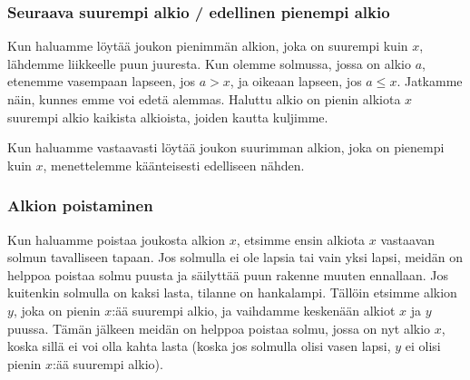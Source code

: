 \subsubsection{Seuraava suurempi alkio / edellinen pienempi alkio}

Kun haluamme löytää joukon pienimmän alkion,
joka on suurempi kuin $x$,
lähdemme liikkeelle puun juuresta.
Kun olemme solmussa, jossa on alkio $a$,
etenemme vasempaan lapseen,
jos $a>x$, ja oikeaan lapseen, jos $a \le x$.
Jatkamme näin, kunnes emme voi edetä alemmas.
Haluttu alkio on pienin alkiota $x$ suurempi alkio
kaikista alkioista, joiden kautta kuljimme.

Kun haluamme vastaavasti löytää joukon suurimman alkion,
joka on pienempi kuin $x$,
menettelemme käänteisesti edelliseen nähden.

\subsubsection{Alkion poistaminen}

Kun haluamme poistaa joukosta alkion $x$, etsimme ensin
alkiota $x$ vastaavan solmun tavalliseen tapaan.
Jos solmulla ei ole lapsia tai vain yksi lapsi,
meidän on helppoa poistaa solmu puusta ja säilyttää
puun rakenne muuten ennallaan.
Jos kuitenkin solmulla on kaksi lasta,
tilanne on hankalampi.
Tällöin etsimme alkion $y$,
joka on pienin $x$:ää suurempi alkio,
ja vaihdamme keskenään alkiot $x$ ja $y$ puussa.
Tämän jälkeen meidän on helppoa poistaa solmu,
jossa on nyt alkio $x$,
koska sillä ei voi olla kahta lasta
(koska jos solmulla olisi vasen lapsi,
$y$ ei olisi pienin $x$:ää suurempi alkio).

